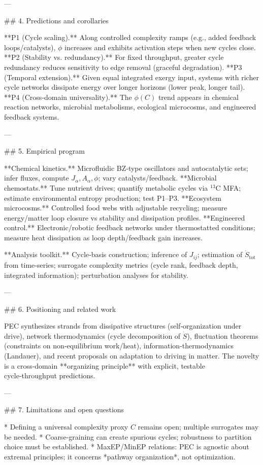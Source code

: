 ---

## 4. Predictions and corollaries

**P1 (Cycle scaling).** Along controlled complexity ramps (e.g., added feedback loops/catalysts), $\phi$ increases and exhibits activation steps when new cycles close.
**P2 (Stability vs. redundancy).** For fixed throughput, greater cycle redundancy reduces sensitivity to edge removal (graceful degradation).
**P3 (Temporal extension).** Given equal integrated exergy input, systems with richer cycle networks dissipate energy over longer horizons (lower peak, longer tail).
**P4 (Cross‑domain universality).** The $\phi(C)$ trend appears in chemical reaction networks, microbial metabolisms, ecological microcosms, and engineered feedback systems.

---

## 5. Empirical program

**Chemical kinetics.** Microfluidic BZ‑type oscillators and autocatalytic sets; infer fluxes, compute $J_\alpha, A_\alpha, \phi$; vary catalysts/feedback.
**Microbial chemostats.** Tune nutrient drives; quantify metabolic cycles via $^{13}$C MFA; estimate environmental entropy production; test P1–P3.
**Ecosystem microcosms.** Controlled food webs with adjustable recycling; measure energy/matter loop closure vs stability and dissipation profiles.
**Engineered control.** Electronic/robotic feedback networks under thermostatted conditions; measure heat dissipation as loop depth/feedback gain increases.

**Analysis toolkit.** Cycle‑basis construction; inference of $J_{ij}$; estimation of $\dot S_{\mathrm{tot}}$ from time‑series; surrogate complexity metrics (cycle rank, feedback depth, integrated information); perturbation analyses for stability.

---

## 6. Positioning and related work

PEC synthesizes strands from dissipative structures (self‑organization under drive), network thermodynamics (cycle decomposition of $\dot S$), fluctuation theorems (constraints on non‑equilibrium work/heat), information‑thermodynamics (Landauer), and recent proposals on adaptation to driving in matter. The novelty is a cross‑domain **organizing principle** with explicit, testable cycle‑throughput predictions.

---

## 7. Limitations and open questions

* Defining a universal complexity proxy $C$ remains open; multiple surrogates may be needed.
* Coarse‑graining can create spurious cycles; robustness to partition choice must be established.
* MaxEP/MinEP relations: PEC is agnostic about extremal principles; it concerns *pathway organization*, not optimization.

